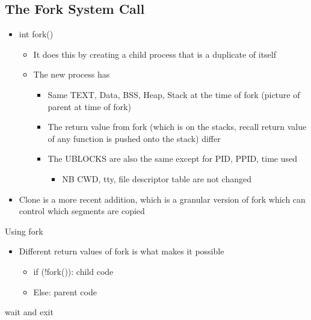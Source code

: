 \subsection{The Fork System Call}
\begin{itemize}
    \item int fork()
    \begin{itemize}
        \item It does this by creating a child process that is a duplicate of itself
        \item The new process has
        \begin{itemize}
            \item Same TEXT, Data, BSS, Heap, Stack at the time of fork (picture of parent at time of fork)
            \item The return value from fork (which is on the stacks, recall return value of any function is pushed onto the stack) differ
            \item The UBLOCKS are also the same except for PID, PPID, time used
            \begin{itemize}
                \item NB CWD, tty, file descriptor table are not changed
            \end{itemize}
        \end{itemize}
    \end{itemize}
    \item Clone is a more recent addition, which is a granular version of fork which can control which segments are copied
\end{itemize}
Using fork
\begin{itemize}
    \item Different return values of fork is what makes it possible
    \begin{itemize}
        \item if (!fork()): child code
        \item Else: parent code
    \end{itemize}
\end{itemize}
wait and exit
